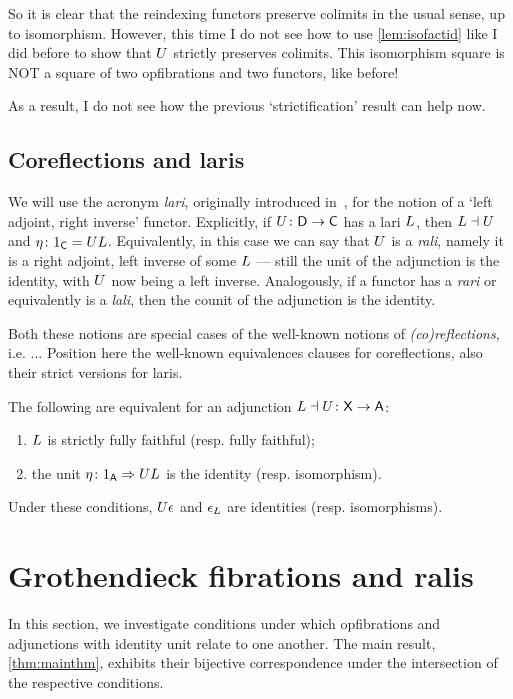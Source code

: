 \documentclass{amsart}
\begin{document}
So it is clear that the reindexing functors preserve colimits in the usual sense, up to isomorphism. However, this time I do not see how to use \cref{lem:isofactid} like I did before to show that $U$ strictly preserves colimits. This isomorphism square is NOT a square of two opfibrations and two functors, like before!

As a result, I do not see how the previous `strictification' result can help now.


\subsection*{Coreflections and laris}

We will use the acronym \emph{lari}, originally introduced in~\cite{Grayfibredandcofibred}, for the notion of a `left adjoint, right inverse' functor. Explicitly, if $U\colon\mathsf{D}\to\mathsf{C}$ has a lari $L$, then $L\dashv U$ and $\eta\colon1_{\mathsf{C}}=UL$. Equivalently, in this case we can say that $U$ is a \emph{rali}, namely it is a right adjoint, left inverse of some $L$ --- still the unit of the adjunction is the identity, with $U$ now being a left inverse. Analogously, if a functor has a \emph{rari} or equivalently is a \emph{lali}, then the counit of the adjunction is the identity.

Both these notions are special cases of the well-known notions of \emph{(co)reflections}, i.e. ...
{\chris Position here the well-known equivalences clauses for coreflections, also their strict versions for laris.}
\begin{prop}\label{prop:coreflection}
 The following are equivalent for an adjunction $L\dashv U\colon\mathsf{X}\to\mathsf{A}$:
 \begin{enumerate}
  \item $L$ is strictly fully faithful (resp. fully faithful);
  \item the unit $\eta\colon1_{\mathsf{A}}\Rightarrow UL$ is the identity (resp. isomorphism).
 \end{enumerate}
Under these conditions, $U\epsilon$ and $\epsilon_L$ are identities (resp. isomorphisms).
\end{prop}


\section{Grothendieck fibrations and ralis}
\label{sec:groth-fibs-ralis}

In this section, we investigate conditions under which opfibrations and adjunctions with identity unit relate to one another. The main result, \cref{thm:mainthm}, exhibits their bijective correspondence under the intersection of the respective conditions.
\end{document}
